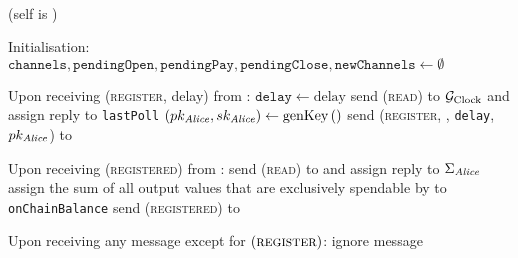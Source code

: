 \ \\  (self is \alice)
  \label{alg:lightningprot}
  \begin{algorithmic}[1]
    \State Initialisation:
    \Indent
      \State $\mathtt{channels}, \mathtt{pendingOpen}, \mathtt{pendingPay},
      \mathtt{pendingClose}, \mathtt{newChannels} \gets \emptyset$
    \EndIndent
    \State

    \State Upon receiving (\textsc{register}, delay) from \environment:
    \Indent
      \State $\mathtt{delay} \gets \mathrm{delay}$
      \State send (\textsc{read}) to $\mathcal{G}_{\mathrm{Clock}}$ and assign reply to
      \texttt{lastPoll}
      \State $\left(pk_{\mathit{Alice}}, sk_{\mathit{Alice}}\right) \gets
      \mathrm{genKey}\left(\right)$
      \State send (\textsc{register}, \alice, \texttt{delay},
      $pk_{\mathit{Alice}}$) to \adversary {}
    \EndIndent
    \State

    \State Upon receiving (\textsc{registered}) from \adversary:
    \Indent
      \State send (\textsc{read}) to \ledger{} and assign reply to
      $\Sigma_{\mathit{Alice}}$
      \State assign the sum of all output values that are exclusively spendable
      by \alice{} to \texttt{onChainBalance}
      \State send (\textsc{registered}) to \environment
    \EndIndent
    \State

    \State Upon receiving any message except for
    $\left(\textsc{register}\right)$:
    \Indent
        \State ignore message
      \EndIf
    \EndIndent
    \State


\end{algorithmic}
